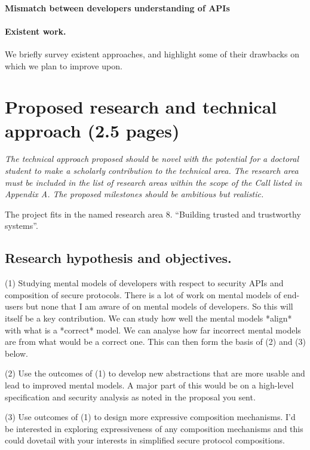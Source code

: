 \documentclass[10pt]{article}
\begin{document}
\paragraph{Mismatch between developers understanding of APIs}


\paragraph{Existent work.} We briefly survey existent approaches, and highlight some of their drawbacks on which we plan to improve upon.

\section{Proposed research and technical approach (2.5 pages)}

\emph{The technical approach proposed should be novel with the potential for a doctoral student to make a scholarly contribution to the technical area. The research area must be included in the list of research areas within the scope of the Call listed in Appendix A. The proposed milestones should be ambitious but realistic.}




%
The project fits in the named research area 8. ``Building trusted and trustworthy systems''. 

\subsection{Research hypothesis and objectives.}




 (1) Studying mental models of developers with respect to security APIs and composition of secure protocols. There is a lot of work on mental models of end-users but none that I am aware of on mental models of developers. So this will itself be a key contribution. We can study how well the mental models *align* with what is a *correct* model. 
 We can analyse how far incorrect mental models are from what would be a correct one. 
 This can then form the basis of (2) and (3) below.
 
(2) Use the outcomes of (1) to develop new abstractions that are more usable and lead to improved mental models. A major part of this would be on a high-level specification and security analysis as noted in the proposal you sent. 

(3) Use outcomes of (1) to design more expressive composition mechanisms. I’d be interested in exploring expressiveness of any composition mechanisms and this could dovetail with your interests in simplified secure protocol compositions. 
\end{document}
